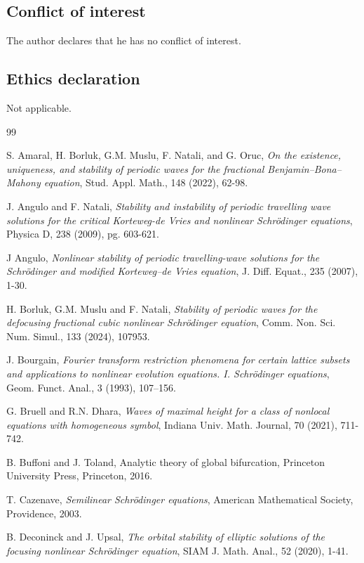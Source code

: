\documentclass[12pt,reqno,a4paper]{amsart} %
\numberwithin{equation}{section}
\numberwithin{figure}{section}
\begin{document}
\subsection*{Conflict of interest} The author declares that he has no conflict
of interest.
\subsection*{Ethics declaration} Not applicable.

\begin{thebibliography}{99}
	
	 S. Amaral, H. Borluk, G.M. Muslu, F. Natali, and G. Oruc, \textit{On the existence, uniqueness, and stability of periodic waves for the fractional Benjamin–Bona–Mahony equation}, Stud. Appl. Math., 148 (2022), 62-98.

 J. Angulo and F. Natali, \textit{Stability and instability of periodic travelling wave solutions for the critical Korteweg-de Vries and nonlinear Schrödinger equations}, Physica D, 238 (2009), pg. 603-621.


 J Angulo,  \textit{Nonlinear stability of periodic travelling-wave solutions for the Schrödinger and modified \mbox{Korteweg}–de Vries equation}, J. Diff. Equat., 235 (2007), 1-30.

 H. Borluk, G.M. Muslu and F. Natali, \textit{Stability of periodic waves for the defocusing fractional cubic nonlinear Schr\"odinger equation}, Comm. Non. Sci. Num. Simul., 133 (2024), 107953.

 J. Bourgain, \textit{Fourier transform restriction phenomena for certain lattice subsets and applications to nonlinear
evolution equations. I. Schr\"odinger equations}, Geom. Funct. Anal., 3 (1993), 107–156.



  G. Bruell and R.N. Dhara, \textit{Waves of maximal height for a class of nonlocal equations with homogeneous symbol}, Indiana Univ. Math. Journal, 70 (2021), 711-742.

 B. Buffoni and J. Toland, Analytic theory of global bifurcation, Princeton University Press, Princeton, 2016.

 T. Cazenave, \textit{Semilinear Schrödinger equations}, American Mathematical Society, Providence, 2003.

 B. Deconinck and J. Upsal, \textit{The orbital stability of elliptic solutions of the focusing nonlinear Schrödinger equation}, SIAM J. Math. Anal., 52 (2020), 1-41.


\end{thebibliography}
\end{document}
